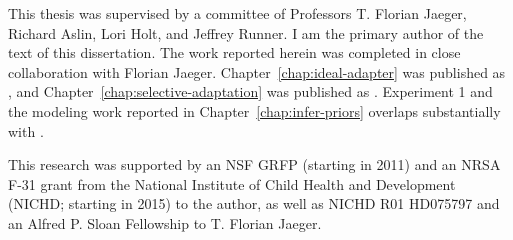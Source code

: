 \begin{contributorsandfunding}
  This thesis was supervised by a committee of Professors T. Florian Jaeger,
  Richard Aslin, Lori Holt, and Jeffrey Runner. I am the primary author of the
  text of this dissertation. The work reported herein was completed in close
  collaboration with Florian Jaeger. Chapter~\ref{chap:ideal-adapter} was
  published as \textcite{Kleinschmidt2015}, and
  Chapter~\ref{chap:selective-adaptation} was published as
  \textcite{Kleinschmidt2015b}. Experiment 1 and the modeling work reported in
  Chapter~\ref{chap:infer-priors} overlaps substantially with
  \textcite{Kleinschmidt2016}.

  This research was supported by an NSF GRFP (starting in 2011) and an NRSA F-31
  grant from the National Institute of Child Health and Development (NICHD;
  starting in 2015) to the author, as well as NICHD R01 HD075797 and an Alfred
  P. Sloan Fellowship to T. Florian Jaeger.
\end{contributorsandfunding}
